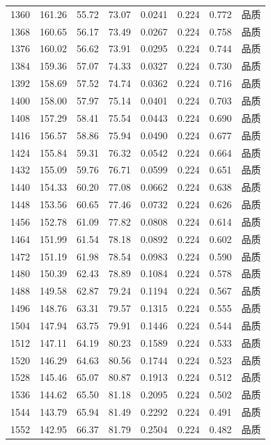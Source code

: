 \begin{longtable}{rrrrrrrr}
1360 & 161.26 & 55.72 & 73.07 & 0.0241 & 0.224 & 0.772 & 品质 \\
1368 & 160.65 & 56.17 & 73.49 & 0.0267 & 0.224 & 0.758 & 品质 \\
1376 & 160.02 & 56.62 & 73.91 & 0.0295 & 0.224 & 0.744 & 品质 \\
1384 & 159.36 & 57.07 & 74.33 & 0.0327 & 0.224 & 0.730 & 品质 \\
1392 & 158.69 & 57.52 & 74.74 & 0.0362 & 0.224 & 0.716 & 品质 \\
1400 & 158.00 & 57.97 & 75.14 & 0.0401 & 0.224 & 0.703 & 品质 \\
1408 & 157.29 & 58.41 & 75.54 & 0.0443 & 0.224 & 0.690 & 品质 \\
1416 & 156.57 & 58.86 & 75.94 & 0.0490 & 0.224 & 0.677 & 品质 \\
1424 & 155.84 & 59.31 & 76.32 & 0.0542 & 0.224 & 0.664 & 品质 \\
1432 & 155.09 & 59.76 & 76.71 & 0.0599 & 0.224 & 0.651 & 品质 \\
1440 & 154.33 & 60.20 & 77.08 & 0.0662 & 0.224 & 0.638 & 品质 \\
1448 & 153.56 & 60.65 & 77.46 & 0.0732 & 0.224 & 0.626 & 品质 \\
1456 & 152.78 & 61.09 & 77.82 & 0.0808 & 0.224 & 0.614 & 品质 \\
1464 & 151.99 & 61.54 & 78.18 & 0.0892 & 0.224 & 0.602 & 品质 \\
1472 & 151.19 & 61.98 & 78.54 & 0.0983 & 0.224 & 0.590 & 品质 \\
1480 & 150.39 & 62.43 & 78.89 & 0.1084 & 0.224 & 0.578 & 品质 \\
1488 & 149.58 & 62.87 & 79.24 & 0.1194 & 0.224 & 0.567 & 品质 \\
1496 & 148.76 & 63.31 & 79.57 & 0.1315 & 0.224 & 0.555 & 品质 \\
1504 & 147.94 & 63.75 & 79.91 & 0.1446 & 0.224 & 0.544 & 品质 \\
1512 & 147.11 & 64.19 & 80.23 & 0.1589 & 0.224 & 0.533 & 品质 \\
1520 & 146.29 & 64.63 & 80.56 & 0.1744 & 0.224 & 0.523 & 品质 \\
1528 & 145.46 & 65.07 & 80.87 & 0.1913 & 0.224 & 0.512 & 品质 \\
1536 & 144.62 & 65.50 & 81.18 & 0.2095 & 0.224 & 0.502 & 品质 \\
1544 & 143.79 & 65.94 & 81.49 & 0.2292 & 0.224 & 0.491 & 品质 \\
1552 & 142.95 & 66.37 & 81.79 & 0.2504 & 0.224 & 0.482 & 品质 \\

\end{longtable}
